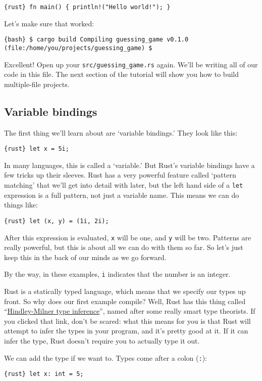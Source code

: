 \documentclass[]{article}
\begin{document}
\texttt{\{rust\} fn main() \{     println!("Hello world!"); \}}

Let's make sure that worked:

\texttt{\{bash\} \$ cargo build    Compiling guessing\_game v0.1.0 (file:/home/you/projects/guessing\_game) \$}

Excellent! Open up your \texttt{src/guessing\_game.rs} again. We'll be
writing all of our code in this file. The next section of the tutorial
will show you how to build multiple-file projects.

\subsection{Variable bindings}\label{variable-bindings}

The first thing we'll learn about are `variable bindings.' They look
like this:

\texttt{\{rust\} let x = 5i;}

In many languages, this is called a `variable.' But Rust's variable
bindings have a few tricks up their sleeves. Rust has a very powerful
feature called `pattern matching' that we'll get into detail with later,
but the left hand side of a \texttt{let} expression is a full pattern,
not just a variable name. This means we can do things like:

\texttt{\{rust\} let (x, y) = (1i, 2i);}

After this expression is evaluated, \texttt{x} will be one, and
\texttt{y} will be two. Patterns are really powerful, but this is about
all we can do with them so far. So let's just keep this in the back of
our minds as we go forward.

By the way, in these examples, \texttt{i} indicates that the number is
an integer.

Rust is a statically typed language, which means that we specify our
types up front. So why does our first example compile? Well, Rust has
this thing called
``\href{http://en.wikipedia.org/wiki/Hindley\%E2\%80\%93Milner_type_system}{Hindley-Milner
type inference}'', named after some really smart type theorists. If you
clicked that link, don't be scared: what this means for you is that Rust
will attempt to infer the types in your program, and it's pretty good at
it. If it can infer the type, Rust doesn't require you to actually type
it out.

We can add the type if we want to. Types come after a colon
(\texttt{:}):

\texttt{\{rust\} let x: int = 5;}
\end{document}
